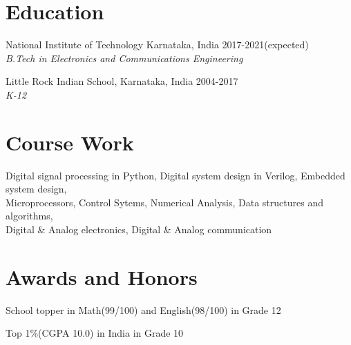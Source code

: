 \documentclass[letterpaper]{article}
\renewenvironment{itemize}{
  \begin{list}{}{
    \setlength{\leftmargin}{1.5em}
  }
}{
  \end{list}
}
\begin{document}
\section*{Education}
  \begin{itemize}
    \item National Institute of Technology Karnataka, India\hfill
    2017-2021(expected)
    \\
    {\sl B.Tech in Electronics and Communications Engineering}

    \item Little Rock Indian School, Karnataka, India\hfill
    2004-2017
    \\
    {\sl K-12}\hfill
  \end{itemize}

\section*{Course Work}
  Digital signal processing in Python, Digital system design in Verilog, Embedded system design, \\
  Microprocessors, Control Sytems, Numerical Analysis, Data structures and algorithms, \\
  Digital \& Analog electronics, Digital \& Analog communication

\section*{Awards and Honors}
\begin{itemize}
  \item School topper in Math(99/100) and English(98/100) in Grade 12
  \item Top 1\%(CGPA 10.0) in India in Grade 10
\end{itemize}

\end{document}
